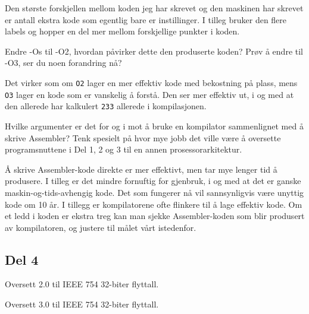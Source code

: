\documentclass{../../myassignment}
\begin{document}
	\begin{answer}
	Den største forskjellen mellom koden jeg har skrevet og den maskinen har skrevet er antall ekstra kode som egentlig bare er instillinger. I tilleg bruker den flere labels og hopper en del mer mellom forskjellige punkter i koden.

	\end{answer}

	\begin{problem}
    Endre -Os til -O2, hvordan påvirker dette den produserte koden? Prøv å endre til -O3, ser du noen forandring nå?

	\end{problem}

	\begin{answer}
	Det virker som om \texttt{O2} lager en mer effektiv kode med bekostning på plass, mens \texttt{O3} lager en kode som er vanskelig å forstå. Den ser mer effektiv ut, i og med at den allerede har kalkulert \texttt{233} allerede i kompilasjonen.

	\end{answer}

	\begin{problem}
    	Hvilke argumenter er det for og i mot å bruke en kompilator sammenlignet med å skrive Assembler? Tenk spesielt på hvor mye jobb det ville være å oversette programsnuttene i Del 1, 2 og 3 til en annen prosessorarkitektur.

	\end{problem}

	\begin{answer}
		Å skrive Assembler-kode direkte er mer effektivt, men tar mye lenger tid å produsere. I tilleg er det mindre fornuftig for gjenbruk, i og med at det er ganske maskin-og-tids-avhengig kode. Det som fungerer nå vil sannsynligvis være unyttig kode om 10 år. I tillegg er kompilatorene ofte flinkere til å lage effektiv kode. Om et ledd i koden er ekstra treg kan man sjekke Assembler-koden som blir produsert av kompilatoren, og justere til målet vårt istedenfor.

	\end{answer}

	\pagebreak
	\subsection*{Del 4}
	\begin{problem}

	    Oversett 2.0 til IEEE 754 32-biter flyttall.

    	Oversett 3.0 til IEEE 754 32-biter flyttall.

	\end{problem}
\end{document}
